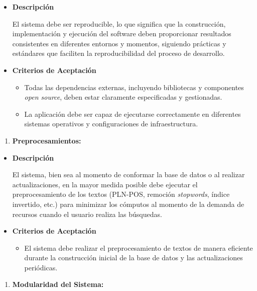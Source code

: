 \documentclass[
  12pt,
  openany]{book}
\providecommand{\tightlist}{%
  \setlength{\itemsep}{0pt}\setlength{\parskip}{0pt}}
\begin{document}
\begin{itemize}
\item
  \textbf{Descripción}

  El sistema debe ser reproducible, lo que significa que la construcción, implementación y ejecución del software deben proporcionar resultados consistentes en diferentes entornos y momentos, siguiendo prácticas y estándares que faciliten la reproducibilidad del proceso de desarrollo.
\item
  \textbf{Criterios de Aceptación}

  \begin{itemize}
  \item
    Todas las dependencias externas, incluyendo bibliotecas y componentes \emph{open source}, deben estar claramente especificadas y gestionadas.
  \item
    La aplicación debe ser capaz de ejecutarse correctamente en diferentes sistemas operativos y configuraciones de infraestructura.
  \end{itemize}
\end{itemize}

\begin{enumerate}
\def\labelenumi{\arabic{enumi}.}
\setcounter{enumi}{3}
\tightlist
\item
  \textbf{Preprocesamientos:}
\end{enumerate}

\begin{itemize}
\item
  \textbf{Descripción}

  El sistema, bien sea al momento de conformar la base de datos o al realizar actualizaciones, en la mayor medida posible debe ejecutar el preprocesamiento de los textos (PLN-POS, remoción \emph{stopwords}, índice invertido, etc.) para minimizar los cómputos al momento de la demanda de recursos cuando el usuario realiza las búsquedas.

  \newpage
\item
  \textbf{Criterios de Aceptación}

  \begin{itemize}
  \tightlist
  \item
    El sistema debe realizar el preprocesamiento de textos de manera eficiente durante la construcción inicial de la base de datos y las actualizaciones periódicas.
  \end{itemize}
\end{itemize}

\begin{enumerate}
\def\labelenumi{\arabic{enumi}.}
\setcounter{enumi}{4}
\tightlist
\item
  \textbf{Modularidad del Sistema:}
\end{enumerate}
\end{document}
